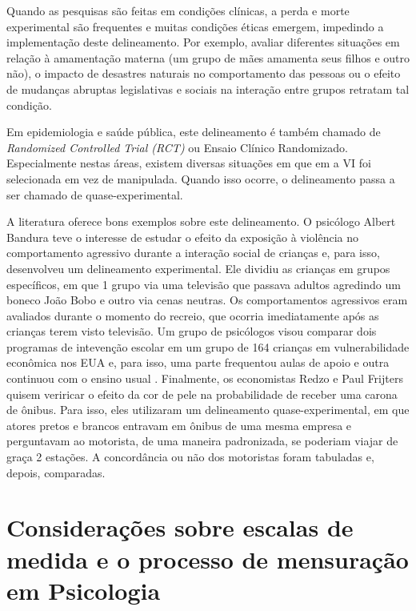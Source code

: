 \documentclass[
]{book}
\begin{document}
Quando as pesquisas são feitas em condições clínicas, a perda e morte experimental são frequentes e muitas condições éticas emergem, impedindo a implementação deste delineamento. Por exemplo, avaliar diferentes situações em relação à amamentação materna (um grupo de mães amamenta seus filhos e outro não), o impacto de desastres naturais no comportamento das pessoas ou o efeito de mudanças abruptas legislativas e sociais na interação entre grupos retratam tal condição.

Em epidemiologia e saúde pública, este delineamento é também chamado de \emph{Randomized Controlled Trial (RCT)} ou Ensaio Clínico Randomizado. Especialmente nestas áreas, existem diversas situações em que em a VI foi selecionada em vez de manipulada. Quando isso ocorre, o delineamento passa a ser chamado de quase-experimental.

A literatura oferece bons exemplos sobre este delineamento. O psicólogo Albert Bandura \citeyearpar{Bandura1961} teve o interesse de estudar o efeito da exposição à violência no comportamento agressivo durante a interação social de crianças e, para isso, desenvolveu um delineamento experimental. Ele dividiu as crianças em grupos específicos, em que 1 grupo via uma televisão que passava adultos agredindo um boneco João Bobo e outro via cenas neutras. Os comportamentos agressivos eram avaliados durante o momento do recreio, que ocorria imediatamente após as crianças terem visto televisão. Um grupo de psicólogos visou comparar dois programas de intevenção escolar em um grupo de 164 crianças em vulnerabilidade econômica nos EUA e, para isso, uma parte frequentou aulas de apoio e outra continuou com o ensino usual \citep{Feil2020}.
Finalmente, os economistas Redzo e Paul Frijters \citeyearpar{Mujcic2020} quisem veriricar o efeito da cor de pele na probabilidade de receber uma carona de ônibus. Para isso, eles utilizaram um delineamento quase-experimental, em que atores pretos e brancos entravam em ônibus de uma mesma empresa e perguntavam ao motorista, de uma maneira padronizada, se poderiam viajar de graça 2 estações. A concordância ou não dos motoristas foram tabuladas e, depois, comparadas.

\hypertarget{considerauxe7uxf5es-sobre-escalas-de-medida-e-o-processo-de-mensurauxe7uxe3o-em-psicologia}{%
\section{Considerações sobre escalas de medida e o processo de mensuração em Psicologia}\label{considerauxe7uxf5es-sobre-escalas-de-medida-e-o-processo-de-mensurauxe7uxe3o-em-psicologia}}
\end{document}
